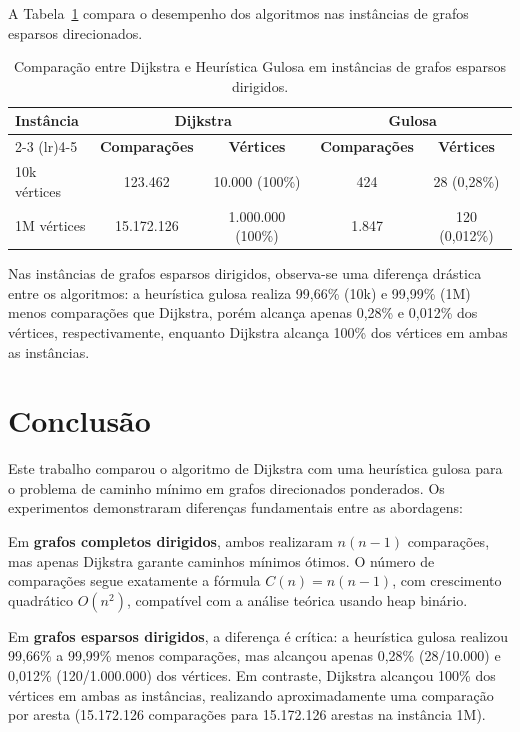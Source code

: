 \documentclass[12pt,a4paper]{article}
\begin{document}
A Tabela~\ref{tab:comparacao_reais} compara o desempenho dos algoritmos nas instâncias de grafos esparsos direcionados.

\begin{table}[H]
    \centering
    \small
    \caption{Comparação entre Dijkstra e Heurística Gulosa em instâncias de grafos esparsos dirigidos.}
    \label{tab:comparacao_reais}
    \begin{tabular}{@{}lcccc@{}}
        \toprule
        \multirow{2}{*}{\textbf{Instância}} & \multicolumn{2}{c}{\textbf{Dijkstra}} & \multicolumn{2}{c}{\textbf{Gulosa}} \\
        \cmidrule(lr){2-3} \cmidrule(lr){4-5}
        & \textbf{Comparações} & \textbf{Vértices} & \textbf{Comparações} & \textbf{Vértices} \\
        \midrule
        10k vértices  & 123.462 & 10.000 (100\%) & 424 & 28 (0,28\%) \\
        1M vértices   & 15.172.126 & 1.000.000 (100\%) & 1.847 & 120 (0,012\%) \\
        \bottomrule
    \end{tabular}
\end{table}

Nas instâncias de grafos esparsos dirigidos, observa-se uma diferença drástica entre os algoritmos: a heurística gulosa realiza 99,66\% (10k) e 99,99\% (1M) menos comparações que Dijkstra, porém alcança apenas 0,28\% e 0,012\% dos vértices, respectivamente, enquanto Dijkstra alcança 100\% dos vértices em ambas as instâncias.


\section{Conclusão}

Este trabalho comparou o algoritmo de Dijkstra com uma heurística gulosa para o problema de caminho mínimo em grafos direcionados ponderados. Os experimentos demonstraram diferenças fundamentais entre as abordagens:

Em \textbf{grafos completos dirigidos}, ambos realizaram $n(n-1)$ comparações, mas apenas Dijkstra garante caminhos mínimos ótimos. O número de comparações segue exatamente a fórmula $C(n) = n(n-1)$, com crescimento quadrático $O(n^2)$, compatível com a análise teórica usando heap binário.

Em \textbf{grafos esparsos dirigidos}, a diferença é crítica: a heurística gulosa realizou 99,66\% a 99,99\% menos comparações, mas alcançou apenas 0,28\% (28/10.000) e 0,012\% (120/1.000.000) dos vértices. Em contraste, Dijkstra alcançou 100\% dos vértices em ambas as instâncias, realizando aproximadamente uma comparação por aresta (15.172.126 comparações para 15.172.126 arestas na instância 1M).
\end{document}
